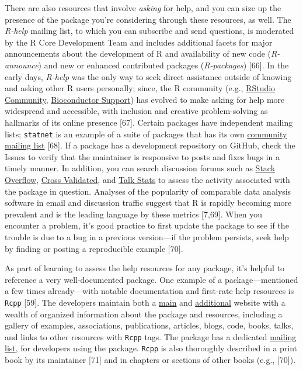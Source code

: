 \documentclass[10pt,letterpaper]{article}
\begin{document}
There are also resources that involve \emph{asking} for help, and you
can size up the presence of the package you're considering through these
resources, as well. The \emph{R-help} mailing list, to which you can
subscribe and send questions, is moderated by the R Core Development
Team and includes additional facets for major announcements about the
development of R and availability of new code (\emph{R-announce}) and
new or enhanced contributed packages (\emph{R-packages}) {[}66{]}. In
the early days, \emph{R-help} was the only way to seek direct assistance
outside of knowing and asking other R users personally; since, the R
community (e.g., \href{https://community.rstudio.com/}{RStudio
Community}, \href{https://support.bioconductor.org/}{Bioconductor
Support}) has evolved to make asking for help more widespread and
accessible, with inclusion and creative problem-solving as hallmarks of
its online presence {[}67{]}. Certain packages have independent mailing
lists; \texttt{statnet} is an example of a suite of packages that has
its own \href{http://statnet.org/}{community mailing list} {[}68{]}. If
a package has a development repository on GitHub, check the Issues to
verify that the maintainer is responsive to posts and fixes bugs in a
timely manner. In addition, you can search discussion forums such as
\href{https://stackoverflow.com/}{Stack Overflow},
\href{https://stats.stackexchange.com/}{Cross Validated}, and
\href{http://www.talkstats.com/}{Talk Stats} to assess the activity
associated with the package in question. Analyses of the popularity of
comparable data analysis software in email and discussion traffic
suggest that R is rapidly becoming more prevalent and is the leading
language by these metrics {[}7,69{]}. When you encounter a problem, it's
good practice to first update the package to see if the trouble is due
to a bug in a previous version---if the problem persists, seek help by
finding or posting a reproducible example {[}70{]}.

As part of learning to assess the help resources for any package, it's
helpful to reference a very well-documented package. One example of a
package---mentioned a few times already---with notable documentation and
first-rate help resources is \texttt{Rcpp} {[}59{]}. The developers
maintain both a \href{http://www.rcpp.org/}{main} and
\href{http://dirk.eddelbuettel.com/code/rcpp.html}{additional} website
with a wealth of organized information about the package and resources,
including a gallery of examples, associations, publications, articles,
blogs, code, books, talks, and links to other resources with
\texttt{Rcpp} tags. The package has a dedicated
\href{https://lists.r-forge.r-project.org/cgi-bin/mailman/listinfo/rcpp-devel}{mailing
list}, for developers using the package. \texttt{Rcpp} is also
thoroughly described in a print book by its maintainer {[}71{]} and in
chapters or sections of other books (e.g., {[}70{]}).
\end{document}
